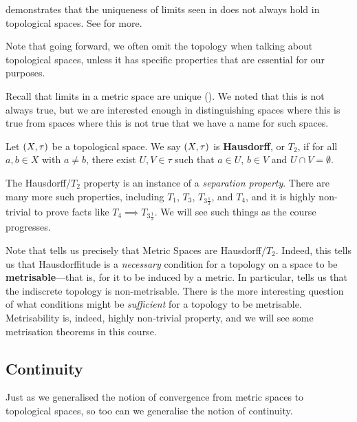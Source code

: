  demonstrates that the uniqueness of limits seen in  does not always hold in topological spaces. See  for more.

Note that going forward, we often omit the topology when talking about topological spaces, unless it has specific properties that are essential for our purposes.

Recall that limits in a metric space are unique (). We noted that this is not always true, but we are interested enough in distinguishing spaces where this is true from spaces where this is not true that we have a name for such spaces.

\begin{boxdefinition}\label{Ch1:Def:Hausdorff}
    Let $\left( X, \tau \right)$ be a topological space. We say $\left( X, \tau \right)$ is \textbf{Hausdorff}, or $T_2$, if for all $a, b \in X$ with $a \neq b$, there exist $U, V \in \tau$ such that $a \in U$, $b \in V$ and $U \cap V = \emptyset$.
\end{boxdefinition}

The Hausdorff/$T_2$ property is an instance of a \textit{separation property}. There are many more such properties, including $T_1$, $T_3$, $T_{3 \frac{1}{2}}$, and $T_4$, and it is highly non-trivial to prove facts like $T_4 \implies T_{3 \frac{1}{2}}$. We will see such things as the course progresses.

Note that  tells us precisely that Metric Spaces are Hausdorff/$T_2$. Indeed, this tells us that Hausdorffitude is a \textit{necessary} condition for a topology on a space to be \textbf{metrisable}---that is, for it to be induced by a metric. In particular,  tells us that the indiscrete topology is non-metrisable. There is the more interesting question of what conditions might be \textit{sufficient} for a topology to be metrisable. Metrisability is, indeed, highly non-trivial property, and we will see some metrisation theorems in this course.

\subsection{Continuity}

Just as we generalised the notion of convergence from metric spaces to topological spaces, so too can we generalise the notion of continuity.

